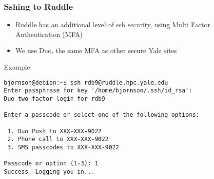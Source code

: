 \documentclass[10pt]{beamer}
\begin{document}
\begin{frame}[fragile]
\frametitle{Sshing to Ruddle}

\begin{itemize}
\item Ruddle has an additional level of ssh security, using Multi Factor Authentication (MFA)
\item We use Duo, the same MFA as other secure Yale sites
\end{itemize}

Example:
\begin{verbatim}
bjornson@debian:~$ ssh rdb9@ruddle.hpc.yale.edu
Enter passphrase for key '/home/bjornson/.ssh/id_rsa': 
Duo two-factor login for rdb9

Enter a passcode or select one of the following options:

 1. Duo Push to XXX-XXX-9022
 2. Phone call to XXX-XXX-9022
 3. SMS passcodes to XXX-XXX-9022

Passcode or option (1-3): 1
Success. Logging you in...
\end{verbatim}  
\end{frame}
\end{document}
